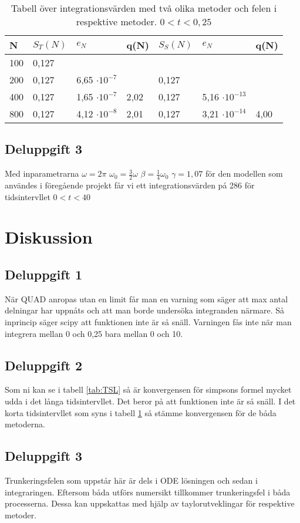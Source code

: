\documentclass[12pt]{article}
\begin{document}
\begin{table}[H]
  \caption{Tabell över integrationsvärden med två olika metoder och felen i respektive metoder. $0<t<0,25$}
  \label{tab:TSS}
    \begin{tabular}{lllllll}
      \hline
      N   & $S_T(N)$ & $e_N$ & q(N) & $S_S(N)$ & $e_N$ & q(N) \\ \hline
      100 & 0,127 &  &  &  &  &  \\
      200 & 0,127 & 6,65 $\cdot 10^{-7}$ &  & 0,127 &  &  \\
      400 & 0,127 & 1,65 $\cdot 10^{-7}$ & 2,02 & 0,127 & 5,16 $\cdot 10^{-13}$ &  \\
      800 & 0,127 & 4,12 $\cdot 10^{-8}$ & 2,01 & 0,127 & 3,21 $\cdot 10^{-14}$ & 4,00 \\ \hline
    \end{tabular}
\end{table}

\subsection{Deluppgift 3}

Med inparametrarna $\omega = 2\pi$ $\omega_0 = \frac{3}{2} \omega$ $\beta = \frac{1}{4}\omega_0$ $\gamma = 1,07$ för den modellen som användes i föregående projekt får vi ett integrationsvärden på 286 för tidsintervllet $0<t<40$

\section{Diskussion}

\subsection{Deluppgift 1}
När QUAD anropas utan en limit får man en varning som säger att max antal delningar har uppnåts och att man borde undersöka integranden närmare. Så inprincip säger scipy att funktionen inte är så snäll. Varningen fås inte när man integrera mellan 0 och 0,25 bara mellan 0 och 10. 

\subsection{Deluppgift 2}
Som ni kan se i tabell \ref{tab:TSL} så är konvergensen för simpsons formel mycket udda i det långa tidsintervllet. Det beror på att funktionen inte är så snäll. I det korta tidsintervllet som syns i tabell \ref{tab:TSS} så stämme konvergensen för de båda metoderna. 

\subsection{Deluppgift 3}
Trunkeringsfelen som uppstår här är dels i ODE lösningen och sedan i integraringen. Eftersom båda utförs numersikt tillkommer trunkeringsfel i båda processerna. Dessa kan uppskattas med hjälp av taylorutveklingar för respektive metoder.
\end{document}
